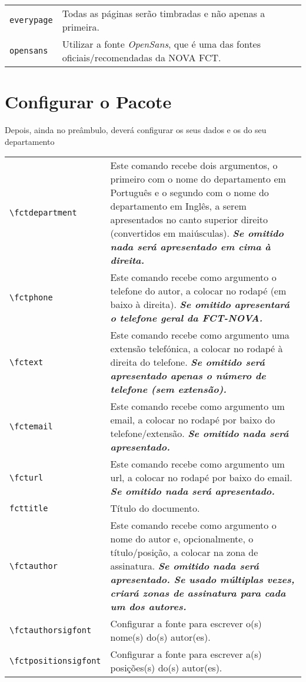 \documentclass[a4paper,11pt]{article}
\newcommand*{\thePackage}{\texttt{\novafctletterheadname}}
\begin{document}
\bgroup
  \renewcommand{\arraystretch}{1.5}
  \begin{xltabular}{\textwidth}{lX}
    \texttt{everypage}  & Todas as páginas serão timbradas e não apenas a primeira.\\
    \texttt{opensans} & Utilizar a fonte \emph{OpenSans}, que é uma das fontes oficiais/recomendadas da NOVA FCT.\\
  \end{xltabular}
\egroup

\section{Configurar o Pacote \thePackage}

Depois, ainda no preâmbulo, deverá configurar os seus dados e os do seu departamento

\bgroup
  \renewcommand{\arraystretch}{1.5}
  \begin{xltabular}{\textwidth}{lX}
    \verb+\fctdepartment+ & Este comando recebe dois argumentos, o primeiro com o nome do departamento em Português e o segundo com o nome do departamento em Inglês, a serem apresentados no canto superior direito (convertidos em maiúsculas).  \textbf{\textsl{Se omitido nada será apresentado em cima à direita.}}\\
    \verb+\fctphone+   & Este comando recebe como argumento o telefone do autor, a colocar no rodapé (em baixo à direita). \textbf{\textsl{Se omitido apresentará o telefone geral da FCT-NOVA.}}\\
    \verb+\fctext+   & Este comando recebe como argumento uma extensão telefónica, a colocar no rodapé à direita do telefone. \textbf{\textsl{Se omitido será apresentado apenas o número de telefone (sem extensão).}}\\
    \verb+\fctemail+  & Este comando recebe como argumento um email, a colocar no rodapé por baixo do telefone/extensão. \textbf{\textsl{Se omitido nada será apresentado.}}\\
    \verb+\fcturl+   & Este comando recebe como argumento um url, a colocar no rodapé por baixo do email. \textbf{\textsl{Se omitido nada será apresentado.}}\\
    \verb+fcttitle+   & Título do documento.\\
    \verb+\fctauthor+     & Este comando recebe como argumento o nome do autor e, opcionalmente, o título/posição, a colocar na zona de assinatura.  \textbf{\textsl{Se omitido nada será apresentado.  Se usado múltiplas vezes, criará zonas de assinatura para cada um dos autores.}}\\
    \verb+\fctauthorsigfont+  &  Configurar a fonte para escrever o(s) nome(s) do(s) autor(es).\\
    \verb+\fctpositionsigfont+  &  Configurar a fonte para escrever a(s) posições(s) do(s) autor(es).\\
  \end{xltabular}
\egroup
\end{document}
